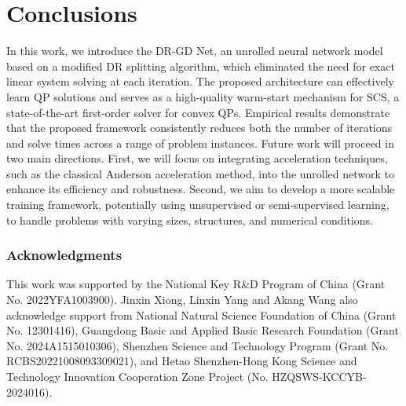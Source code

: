 \documentclass[10pt]{article} %
\begin{document}
\section{Conclusions}
In this work, we introduce the DR-GD Net, an unrolled neural network model based on a modified DR splitting algorithm, which eliminated the need for exact linear system solving at each iteration. 
The proposed architecture can effectively learn QP solutions and serves as a high-quality warm-start mechanism for SCS, a state-of-the-art first-order solver for convex QPs.
Empirical results demonstrate that the proposed framework consistently reduces both the number of iterations and solve times across a range of problem instances. 
Future work will proceed in two main directions. First, we will focus on integrating acceleration techniques, such as the classical Anderson acceleration method, into the unrolled network to enhance its efficiency and robustness. Second, we aim to develop a more scalable training framework, potentially using unsupervised or semi-supervised learning, to handle problems with varying sizes, structures, and numerical conditions.

\subsubsection*{Acknowledgments}
This work was supported by the National Key R\&D Program of China (Grant No. 2022YFA1003900). 
Jinxin Xiong, Linxin Yang and Akang Wang also acknowledge support from National Natural Science Foundation of China (Grant No. 12301416), Guangdong Basic and Applied Basic Research Foundation (Grant No. 2024A1515010306), Shenzhen Science and Technology Program
(Grant No. RCBS20221008093309021), and Hetao Shenzhen-Hong Kong Science and Technology Innovation Cooperation Zone Project (No. HZQSWS-KCCYB-2024016).



% 
% 





\end{document}
